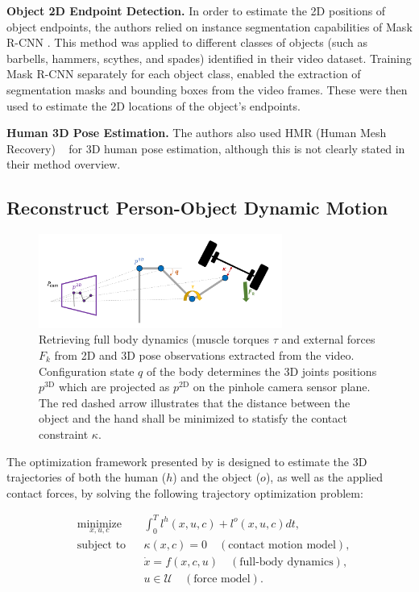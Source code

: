 \noindent\textbf{Object 2D Endpoint Detection.} In order to estimate the 2D positions of object endpoints, the authors relied on instance segmentation 
capabilities of Mask R-CNN \cite{he2017mask}. This method was applied to different classes of objects (such as barbells, hammers, scythes, 
and spades) identified in their video dataset. Training Mask R-CNN separately for each object class, enabled the extraction of segmentation masks
and bounding boxes from the video frames. These were then used to estimate the 2D locations of the object's endpoints.

\noindent\textbf{Human 3D Pose Estimation.} The authors also used HMR (Human Mesh Recovery) ~\cite{kanazawa2018end} for 3D human pose estimation, although this 
is not clearly stated in their method overview.


\subsection{Reconstruct Person-Object Dynamic Motion}
\label{subsec:reconstruct_original}

\begin{figure}[H]
    \centering
    \includegraphics[width=8cm]{figures/original_model_overview.png}
    \caption{Retrieving full body dynamics (muscle torques $\tau$ and external forces $F_{k}$ from 2D and 3D pose observations extracted from the video.
    Configuration state $q$ of the body determines the 3D joints positions $p^{\textrm{3D}}$ which are projected as $p^{\text{2D}}$ on the pinhole camera sensor plane. The red dashed arrow illustrates that the distance between the object and the hand shall be minimized to statisfy the contact constraint $\kappa$.
    }
    \label{fig:original_model_overview}
\end{figure}


The optimization framework presented by \citet{li2019estimating} is designed to estimate the 3D trajectories of both the human ($h$) and the object ($o$), 
as well as the applied contact forces, by solving the following trajectory optimization problem: 

\begin{equation*}
    \begin{aligned}
        & \underset{x,u,c}{\text{minimize}}
        & & \int_{0}^{T} l^h(x, u, c) + l^o(x, u, c)dt, \\
        & \text{subject to}
        & & \kappa(x, c) = 0 \quad (\text{contact motion model}), \\
        &&& \dot{x} = f (x, c, u) \quad (\text{full-body dynamics}), \\
        &&& u \in \mathcal{U} \quad (\text{force model}).
    \end{aligned}
\end{equation*}



